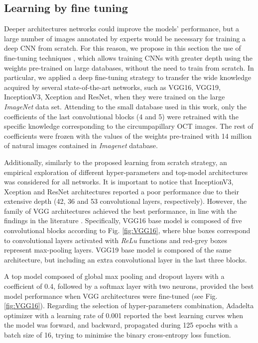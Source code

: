 \subsection{Learning by fine tuning} \label{subsec: Deep_learning}

Deeper architectures networks could improve the models' performance, but a large number of images annotated by experts would be necessary for training a deep CNN from scratch. For this reason, we propose in this section the use of fine-tuning techniques \cite{hoo2016}, which allows training CNNs with greater depth using the weights pre-trained on large databases, without the need to train from scratch. In particular, we applied a deep fine-tuning \cite{tajbakhsh2016} strategy to transfer the wide knowledge acquired by several state-of-the-art networks, such as VGG16, VGG19, InceptionV3, Xception and ResNet, when they were trained on the large \textit{ImageNet} data set. Attending to the small database used in this work, only the coefficients of the last convolutional blocks (4 and 5) were retrained with the specific knowledge corresponding to the circumpapillary OCT images. The rest of coefficients were frozen with the values of the weights pre-trained with 14 million of natural images contained in \textit{Imagenet} database.

Additionally, similarly to the proposed learning from scratch strategy, an empirical exploration of different hyper-parameters and top-model architectures was considered for all networks. It is important to notice that InceptionV3, Xception and ResNet architectures reported a poor performance due to their extensive depth (42, 36 and 53 convolutional layers, respectively). However, the family of VGG architectures achieved the best performance, in line with the findings in the literature \cite{gomez2019automatic}. Specifically, VGG16 base model is composed of five convolutional blocks according to Fig. \ref{fig:VGG16}, where blue boxes correspond to convolutional layers activated with \textit{ReLu} functions and red-grey boxes represent max-pooling layers. VGG19 base model is composed of the same architecture, but including an extra convolutional layer in the last three blocks. 

A top model composed of global max pooling and dropout layers with a coefficient of 0.4, followed by a softmax layer with two neurons, provided the best model performance when VGG architectures were fine-tuned (see Fig. \ref{fig:VGG16}). Regarding the selection of hyper-parameters combination, Adadelta optimizer with a learning rate of 0.001 reported the best learning curves when the model was forward, and backward, propagated during 125 epochs with a batch size of 16, trying to minimise the binary cross-entropy loss function.  

